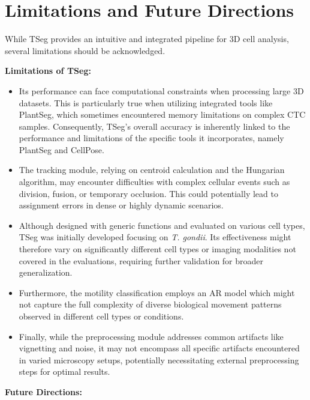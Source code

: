 \documentclass[./dissertation.tex]{subfiles}
\begin{document}
\section{Limitations and Future Directions}
While TSeg provides an intuitive and integrated pipeline for 3D cell analysis, several limitations should be acknowledged.

\textbf{Limitations of TSeg:}
\begin{itemize}
    \item Its performance can face computational constraints when processing large 3D datasets. This is particularly true when utilizing integrated tools like PlantSeg, which sometimes encountered memory limitations on complex CTC samples. Consequently, TSeg's overall accuracy is inherently linked to the performance and limitations of the specific tools it incorporates, namely PlantSeg and CellPose.

    \item The tracking module, relying on centroid calculation and the Hungarian algorithm, may encounter difficulties with complex cellular events such as division, fusion, or temporary occlusion. This could potentially lead to assignment errors in dense or highly dynamic scenarios.

    \item  Although designed with generic functions and evaluated on various cell types, TSeg was initially developed focusing on \textit{T. gondii}. Its effectiveness might therefore vary on significantly different cell types or imaging modalities not covered in the evaluations, requiring further validation for broader generalization.

    \item Furthermore, the motility classification employs an AR model which might not capture the full complexity of diverse biological movement patterns observed in different cell types or conditions.

    \item  Finally, while the preprocessing module addresses common artifacts like vignetting and noise, it may not encompass all specific artifacts encountered in varied microscopy setups, potentially necessitating external preprocessing steps for optimal results.

\end{itemize}
\textbf{Future Directions:}
\end{document}
